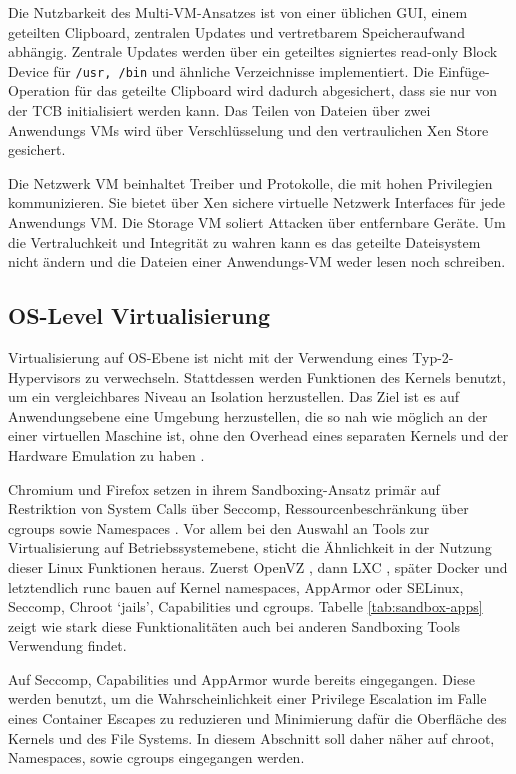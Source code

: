 Die Nutzbarkeit des Multi-VM-Ansatzes ist von einer üblichen GUI, einem geteilten Clipboard, zentralen Updates und vertretbarem Speicheraufwand abhängig. Zentrale Updates werden über ein geteiltes signiertes read-only Block Device für \texttt{/usr, /bin} und ähnliche Verzeichnisse implementiert. Die Einfüge-Operation für das geteilte Clipboard wird dadurch abgesichert, dass sie nur von der TCB initialisiert werden kann. Das Teilen von Dateien über zwei Anwendungs VMs wird über
Verschlüsselung und den vertraulichen Xen Store gesichert. 

Die Netzwerk VM beinhaltet Treiber und Protokolle, die mit hohen Privilegien kommunizieren. Sie bietet über Xen sichere virtuelle Netzwerk Interfaces für jede Anwendungs VM. Die Storage VM soliert Attacken über entfernbare Geräte. Um die Vertraluchkeit und Integrität zu wahren kann es das geteilte Dateisystem nicht ändern und die Dateien einer Anwendungs-VM weder lesen noch schreiben.



\subsection{OS-Level Virtualisierung}

Virtualisierung auf OS-Ebene ist nicht mit der Verwendung eines Typ-2-Hypervisors zu verwechseln. Stattdessen werden Funktionen des Kernels benutzt, um ein vergleichbares Niveau an Isolation herzustellen.
Das Ziel ist es auf Anwendungsebene eine Umgebung herzustellen, die so nah wie möglich an der einer virtuellen Maschine ist, ohne den Overhead eines separaten Kernels und der Hardware Emulation zu haben \cite{lxc}.

Chromium und Firefox setzen in ihrem Sandboxing-Ansatz primär auf Restriktion von System Calls über Seccomp, Ressourcenbeschränkung über cgroups sowie Namespaces \cite{firefox-sandbox, chromium-sandbox}. 
Vor allem bei den Auswahl an Tools zur Virtualisierung auf Betriebssystemebene, sticht die Ähnlichkeit in der Nutzung dieser Linux Funktionen heraus. Zuerst OpenVZ \cite{openvz}, dann LXC
\cite{lxc}, später Docker \cite{docker} und letztendlich runc \cite{runc} bauen auf Kernel namespaces, AppArmor oder SELinux, Seccomp, Chroot `jails', Capabilities und cgroups. 
Tabelle \ref{tab:sandbox-apps} zeigt wie stark diese Funktionalitäten auch bei anderen Sandboxing Tools Verwendung findet.

Auf Seccomp, Capabilities und AppArmor wurde bereits eingegangen. Diese werden
benutzt, um die Wahrscheinlichkeit einer Privilege Escalation im Falle eines Container Escapes zu reduzieren und Minimierung dafür die Oberfläche des Kernels und des File Systems. In diesem Abschnitt soll daher näher auf chroot, Namespaces, sowie cgroups eingegangen werden.


